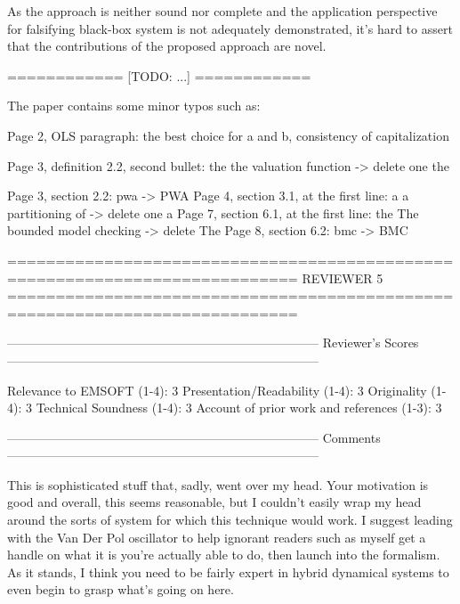 As the approach is neither sound nor complete and the application perspective
for falsifying black-box system is not adequately demonstrated, it's hard to
assert that the contributions of the proposed approach are novel.

   ============
   [TODO: ...]
   ============


The paper contains some minor typos such as:

Page 2, OLS paragraph: the best choice for a and b, consistency of
capitalization

Page 3, definition 2.2, second bullet: the the valuation function -> delete
one the

Page 3, section 2.2: pwa -> PWA
Page 4, section 3.1, at the first line: a a partitioning of -> delete one
a
Page 7, section 6.1, at the first line: the The bounded model checking ->
delete The
Page 8, section 6.2: bmc -> BMC

============================================================================
                            REVIEWER 5
============================================================================


---------------------------------------------------------------------------
Reviewer's Scores
---------------------------------------------------------------------------

               Relevance to EMSOFT (1-4): 3
          Presentation/Readability (1-4): 3
                       Originality (1-4): 3
               Technical Soundness (1-4): 3
Account of prior work and references (1-3): 3


---------------------------------------------------------------------------
Comments
---------------------------------------------------------------------------

This is sophisticated stuff that, sadly, went over my head. Your motivation is
good and overall, this seems reasonable, but I couldn't easily wrap my head
around the sorts of system for which this technique would work. I suggest
leading with the Van Der Pol oscillator to help ignorant readers such as myself
get a handle on what it is you're actually able to do, then launch into the
formalism. As it stands, I think you need to be fairly expert in hybrid
dynamical systems to even begin to grasp what's going on here.


